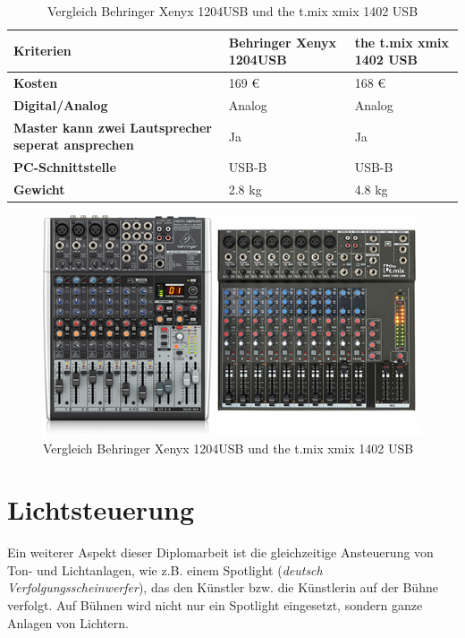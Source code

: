 \begin{table} [H]
	\begin{tabular}{ |p{3.1cm} |p{4.8cm}|p{4.8cm}| }
		\hline
		\textbf{Kriterien} & \textbf{Behringer Xenyx 1204USB}& \textbf{the t.mix xmix 1402 USB}\\
		\hline
		\textbf{Kosten} & 169 € & 168 €  \\ 
		\hline
		\textbf{Digital/Analog} & Analog & Analog   \\  
		\hline
		\textbf{Master kann zwei Lautsprecher seperat ansprechen} & Ja & Ja \\
		\hline
		\textbf{PC-Schnittstelle} & USB-B & USB-B  \\
		\hline
		\textbf{Gewicht}& 2.8 kg & 4.8 kg \\
		\hline	
	\end{tabular}
	\caption{Vergleich Behringer Xenyx 1204USB und the t.mix xmix 1402 USB} 
\end{table} 

\begin{figure}[H]
	\centering
	\includegraphics[width=0.8\linewidth]{images/the.t.mix.xmix1402-Behringer1204USB.png}
	\caption[Vergleich Behringer Xenyx 1204USB und the t.mix xmix 1402 USB]{Vergleich Behringer Xenyx 1204USB und the t.mix xmix 1402 USB}
	\label{fig:Behringer Xenyx 1204USB-the t.mix xmix 1402 USB}
\end{figure}

\section{Lichtsteuerung}
Ein weiterer Aspekt dieser Diplomarbeit ist die gleichzeitige Ansteuerung von Ton- und Lichtanlagen, wie z.B. einem Spotlight (\textit{deutsch Verfolgungsscheinwerfer}), das den Künstler bzw. die Künstlerin auf der Bühne verfolgt. Auf Bühnen wird nicht nur ein Spotlight eingesetzt, sondern ganze Anlagen von Lichtern. 

